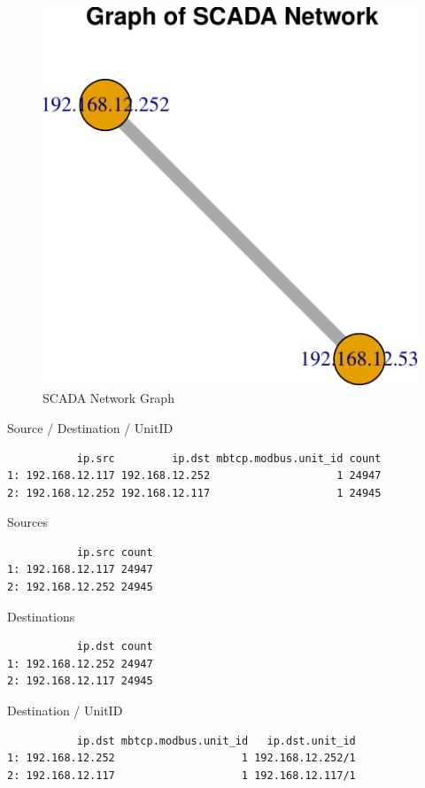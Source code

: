 \documentclass[12pt,]{article}
\begin{document}
\begin{figure}

{\centering \includegraphics{thesis_files/figure-latex/warning-1} 

}

\caption{SCADA Network Graph}\label{fig:warning}
\end{figure}

Source / Destination / UnitID

\begin{verbatim}
           ip.src         ip.dst mbtcp.modbus.unit_id count
1: 192.168.12.117 192.168.12.252                    1 24947
2: 192.168.12.252 192.168.12.117                    1 24945
\end{verbatim}

Sources

\begin{verbatim}
           ip.src count
1: 192.168.12.117 24947
2: 192.168.12.252 24945
\end{verbatim}

Destinations

\begin{verbatim}
           ip.dst count
1: 192.168.12.252 24947
2: 192.168.12.117 24945
\end{verbatim}

Destination / UnitID

\begin{verbatim}
           ip.dst mbtcp.modbus.unit_id   ip.dst.unit_id
1: 192.168.12.252                    1 192.168.12.252/1
2: 192.168.12.117                    1 192.168.12.117/1
\end{verbatim}
\end{document}
